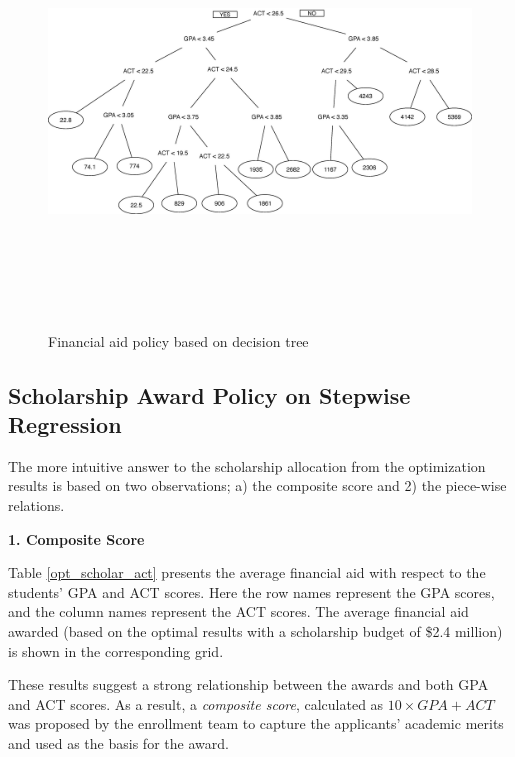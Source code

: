\documentclass[12pt,english]{report}
\begin{document}
\begin{figure}
\includegraphics[width=6.5in, height=4.5in]{pic/FA_DT_Result.eps}%
\caption{Financial aid policy based on decision tree }
\label{FApolicybyDT}
\end{figure}
 
\subsection{Scholarship Award Policy on Stepwise Regression}
The more intuitive answer to the scholarship allocation from the optimization results is based on two observations; a) the composite score and 2) the piece-wise relations.  

\vspace{0.1in}
\noindent \textbf{1. Composite Score} 

\noindent Table \ref{opt_scholar_act} presents the average financial aid with respect to the students' GPA and ACT scores. Here the row names represent the GPA scores, and the column names represent the ACT scores. The average financial aid awarded (based on the optimal results with a scholarship budget of \$2.4 million) is shown in the corresponding grid.

These results suggest a strong relationship between the awards and both GPA and ACT scores. As a result, a \textit{composite score}, calculated as $10\times GPA + ACT $ was proposed by the enrollment team to capture the applicants' academic merits and used as the basis for the award.
\end{document}
